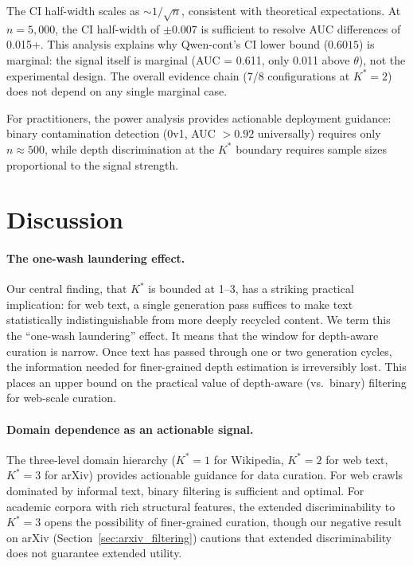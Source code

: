 \documentclass[11pt,a4paper]{article}
\begin{document}
The CI half-width scales as $\sim 1/\sqrt{n}$, consistent with theoretical expectations. At $n{=}5{,}000$, the CI half-width of $\pm 0.007$ is sufficient to resolve AUC differences of 0.015+. This analysis explains why Qwen-cont's CI lower bound ($0.6015$) is marginal: the signal itself is marginal (AUC = 0.611, only 0.011 above $\theta$), not the experimental design. The overall evidence chain (7/8 configurations at $K^*{=}2$) does not depend on any single marginal case.

For practitioners, the power analysis provides actionable deployment guidance: binary contamination detection (0v1, AUC $> 0.92$ universally) requires only $n \approx 500$, while depth discrimination at the $K^*$ boundary requires sample sizes proportional to the signal strength.


\section{Discussion}

\paragraph{The one-wash laundering effect.}
Our central finding, that $K^*$ is bounded at 1--3, has a striking practical implication: for web text, a single generation pass suffices to make text statistically indistinguishable from more deeply recycled content. We term this the ``one-wash laundering'' effect. It means that the window for depth-aware curation is narrow. Once text has passed through one or two generation cycles, the information needed for finer-grained depth estimation is irreversibly lost. This places an upper bound on the practical value of depth-aware (vs.\ binary) filtering for web-scale curation.

\paragraph{Domain dependence as an actionable signal.}
The three-level domain hierarchy ($K^*{=}1$ for Wikipedia, $K^*{=}2$ for web text, $K^*{=}3$ for arXiv) provides actionable guidance for data curation. For web crawls dominated by informal text, binary filtering is sufficient and optimal. For academic corpora with rich structural features, the extended discriminability to $K^*{=}3$ opens the possibility of finer-grained curation, though our negative result on arXiv (Section~\ref{sec:arxiv_filtering}) cautions that extended discriminability does not guarantee extended utility.
\end{document}
